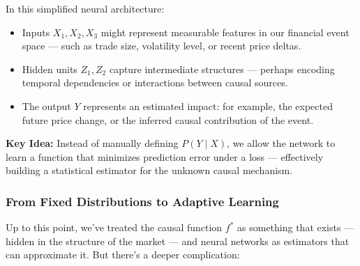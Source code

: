 \begin{center}
\end{center}

\noindent In this simplified neural architecture:
\begin{itemize}
    \item Inputs \( X_1, X_2, X_3 \) might represent measurable features in our financial event space — such as trade size, volatility level, or recent price deltas.
    \item Hidden units \( Z_1, Z_2 \) capture intermediate structures — perhaps encoding temporal dependencies or interactions between causal sources.
    \item The output \( Y \) represents an estimated impact: for example, the expected future price change, or the inferred causal contribution of the event.
\end{itemize}

\textbf{Key Idea:} Instead of manually defining \( P(Y \mid X) \), we allow the network to learn a function that minimizes prediction error under a loss — effectively building a statistical estimator for the unknown causal mechanism.


\subsubsection{From Fixed Distributions to Adaptive Learning}

Up to this point, we've treated the causal function \( f^* \) as something that exists — hidden in the structure of the market — and neural networks as estimators that can approximate it. But there’s a deeper complication:

